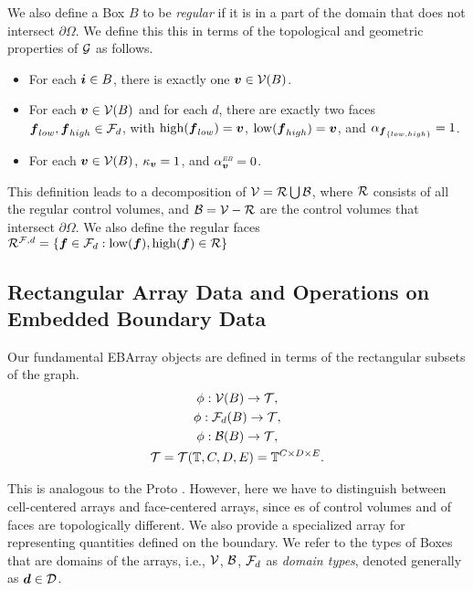 \documentclass[12pt]{article}
\newcommand{\low}{{\rm{low}}}
\newcommand{\high}{{\rm{high}}}
\newcommand{\vof}{{\mbf{v}}}
\newcommand{\face}{{\mbf{f}}}
\newcommand{\dgen}{{\mbf{d}}}
\newcommand{\ebsub}{{\text{\it \tiny EB}}}
\begin{document}
We also define a Box $B$ to be {\it regular} if it is in a part of the domain that does not intersect $\partial \Omega$. We define this this in terms of the topological and geometric properties of ${\mathcal{G}}$ as follows.
\begin{itemize}
\item
For each ${\boldsymbol{i}} \in B$, there is exactly one $\vof \in \mcl{V}(B)$.
\item
For each $\vof \in \mcl{V}(B)$ and for each $d$, there are exactly two faces 
$\face_{low}, \face_{high} \in \mcl{F}_d$, with $\high(\face_{low}) = \vof$, $\low(\face_{high}) = \vof$, and $\alpha_{\face_{\{low,high\} }} = 1$.
\item
For each $\vof \in \mcl{V}(B)$, $\kappa_\vof = 1$, and $\alpha^\ebsub_\vof = 0$.
\end{itemize}

This definition leads to a decomposition of ${\mathcal{V}} = {\mathcal{R}} \bigcup {\mathcal{B}}$, where ${\mathcal{R}}$ consists of all the regular control volumes, and ${\mathcal{B}} = {\mathcal{V}} - {\mathcal{R}}$ are the control volumes that intersect $\partial \Omega$. We also define the regular faces  $\mcl{R}^{\mcl{F},d} = \{\face \in \mcl{F}_d : \low(\face),\high(\face) \in \mcl{R}\}$

\subsection{Rectangular Array Data and Operations on Embedded Boundary Data}

Our fundamental EBArray objects are defined in terms of the rectangular subsets of the graph.
\begin{gather*}
\phi : {\mathcal{V}}(B) \rightarrow {\mathcal{T}} ,\\
\phi : {\mathcal{F}}_d (B) \rightarrow {\mathcal{T}}, \\
\phi : {\mathcal{B}}(B) \rightarrow {\mathcal{T}}, \\
{\mathcal{T}} = {\mathcal{T}}(\mathbb{T},C,D,E) = \mathbb{T}^{C \times D \times E}.
\end{gather*}

This is analogous to the Proto . However, here we have to distinguish between cell-centered arrays and face-centered arrays, since es of control volumes and of faces are topologically different. We also provide a specialized array for representing quantities defined on the boundary. We refer to the types of Boxes that are domains of the arrays, i.e., ${\mathcal{V}}$, ${\mathcal{B}}$, ${\mathcal{F}}_d$ as {\it domain types},  denoted generally as $\dgen \in \mcl{D}$.
\end{document}
